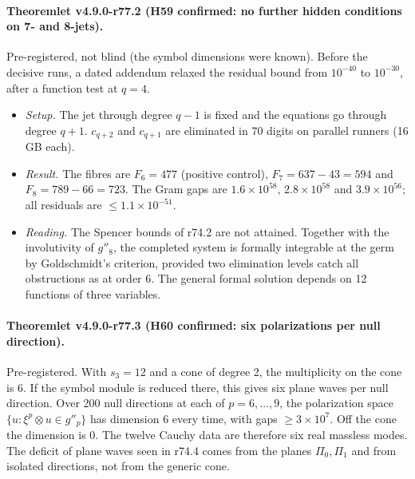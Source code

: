 \paragraph{Theoremlet v4.9.0-r77.2 (H59 confirmed: no further hidden conditions on 7- and 8-jets).}
Pre-registered, not blind (the symbol dimensions were known).  Before the decisive runs, a dated addendum relaxed the
residual bound from \(10^{-40}\) to \(10^{-30}\), after a function test at \(q=4\).
\begin{itemize}[leftmargin=2em]
\item \emph{Setup.}  The jet through degree \(q-1\) is fixed and the equations go through degree \(q+1\).  \(c_{q+2}\) and
\(c_{q+1}\) are eliminated in 70 digits on parallel runners (16 GB each).
\item \emph{Result.}  The fibres are \(F_6=477\) (positive control), \(F_7=637-43=594\) and \(F_8=789-66=723\).  The Gram gaps
are \(1.6\times10^{58}\), \(2.8\times10^{58}\) and \(3.9\times10^{56}\); all residuals are \(\le1.1\times10^{-51}\).
\item \emph{Reading.}  The Spencer bounds of r74.2 are not attained.  Together with the involutivity of \(g''_8\), the
completed system is formally integrable at the germ by Goldschmidt's criterion, provided two elimination levels catch all
obstructions as at order 6.  The general formal solution depends on 12 functions of three variables.
\end{itemize}

\paragraph{Theoremlet v4.9.0-r77.3 (H60 confirmed: six polarizations per null direction).}
Pre-registered.  With \(s_3=12\) and a cone of degree 2, the multiplicity on the cone is 6.  If the symbol module is reduced
there, this gives six plane waves per null direction.  Over 200 null directions at each of \(p=6,\dots,9\), the polarization
space \(\{u:\xi^p\otimes u\in g''_p\}\) has dimension 6 every time, with gaps \(\ge3\times10^7\).  Off the cone the dimension
is 0.  The twelve Cauchy data are therefore six real massless modes.  The deficit of plane waves seen in r74.4 comes from the
planes \(\Pi_0,\Pi_1\) and from isolated directions, not from the generic cone.

